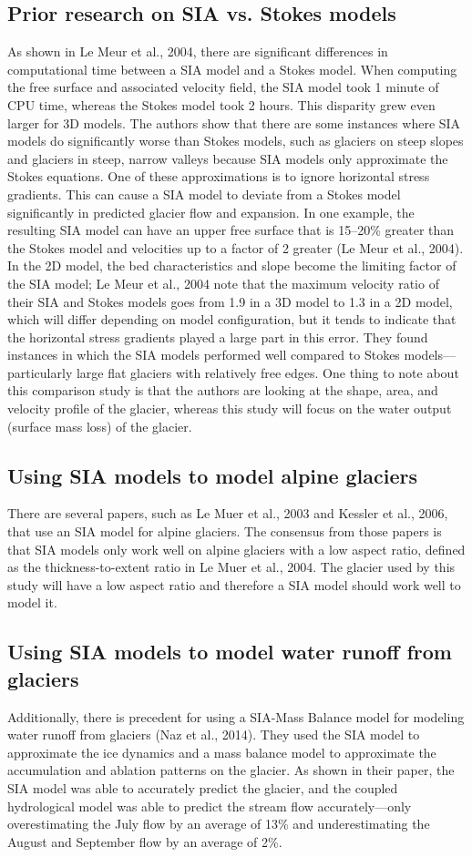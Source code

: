 \documentclass{article}
\begin{document}
\subsection{Prior research on SIA vs. Stokes models}
    As shown in Le Meur et al., 2004, there are significant differences in computational time between a SIA model and a Stokes model. When 
computing the free surface and associated velocity field, the SIA model took 1 minute of CPU time, whereas the Stokes model took 2 hours. 
This disparity grew even larger for 3D models. The authors show that there are some instances where SIA models do significantly worse than 
Stokes models, such as glaciers on steep slopes and glaciers in steep, narrow valleys because SIA models only approximate the Stokes 
equations. One of these approximations is to ignore horizontal stress gradients. This can cause a SIA model to deviate from a Stokes model 
significantly in predicted glacier flow and expansion. In one example, the resulting SIA model can have an upper free surface that is 
15--20\% greater than the Stokes model and velocities up to a factor of 2 greater (Le Meur et al., 2004). In the 2D model, the bed 
characteristics and slope become the limiting factor of the SIA model; Le Meur et al., 2004 note that the maximum velocity ratio of their 
SIA and Stokes models goes from 1.9 in a 3D model to 1.3 in a 2D model, which will differ depending on model configuration, but it tends to 
indicate that the horizontal stress gradients played a large part in this error. They found instances in which the SIA models performed well 
compared to Stokes models---particularly large flat glaciers with relatively free edges. One thing to note about this comparison study is 
that the authors are looking at the shape, area, and velocity profile of the glacier, whereas this study will focus on the water output 
(surface mass loss) of the glacier.
\subsection{Using SIA models to model alpine glaciers}
    There are several papers, such as Le Muer et al., 2003 and Kessler et al., 2006, that use an SIA model for alpine glaciers. The consensus 
from those papers is that SIA models only work well on alpine glaciers with a low aspect ratio, defined as the thickness-to-extent ratio in 
Le Muer et al., 2004. The glacier used by this study will have a low aspect ratio and therefore a SIA model should work well to model it.
\subsection{Using SIA models to model water runoff from glaciers}
    Additionally, there is precedent for using a SIA-Mass Balance model for modeling water runoff from glaciers (Naz et al., 2014). They used 
the SIA model to approximate the ice dynamics and a mass balance model to approximate the accumulation and ablation patterns on the glacier. 
As shown in their paper, the SIA model was able to accurately predict the glacier, and the coupled hydrological model was able to predict 
the stream flow accurately---only overestimating the July flow by an average of 13\% and underestimating the August and September flow by an 
average of 2\%.
\end{document}
